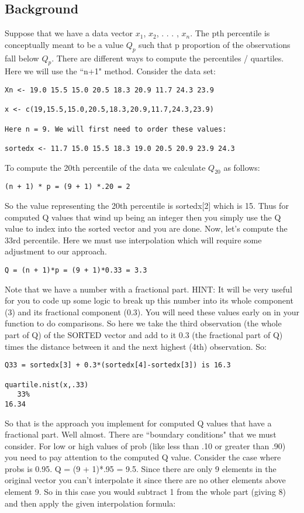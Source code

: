 \documentclass{article}
\begin{document}
\subsection{Background}
Suppose that we have a data vector $x_1$, $x_2$, . . . , $x_n$. The pth percentile is conceptually meant to be a value $Q_p$ such that p proportion of the observations fall below $Q_p$. There are different ways to compute the percentiles / quartiles. Here we will use the ``n+1" method. Consider the data set:
\begin{verbatim}
Xn <- 19.0 15.5 15.0 20.5 18.3 20.9 11.7 24.3 23.9  

x <- c(19,15.5,15.0,20.5,18.3,20.9,11.7,24.3,23.9)

Here n = 9. We will first need to order these values:

sortedx <- 11.7 15.0 15.5 18.3 19.0 20.5 20.9 23.9 24.3

\end{verbatim}
\noindent
To compute the 20th  percentile of the data we calculate $Q_{20}$ as follows:
\begin{verbatim}
(n + 1) * p = (9 + 1) *.20 = 2
\end{verbatim}
\noindent
So the value representing the 20th percentile is sortedx[2] which is 15.
Thus for computed Q values that wind up being an integer then you simply use the Q value to index into the sorted vector and you are done. Now, let's compute the 33rd percentile. Here we must use interpolation which will require some adjustment to our approach.
\begin{verbatim}
Q = (n + 1)*p = (9 + 1)*0.33 = 3.3 
\end{verbatim}
\noindent
Note that we have a number with a fractional part. HINT: It will be very useful for you to code up some logic to break up this number into its whole component (3) and its fractional component (0.3). You will need these values early on in your function to do comparisons. So here we take the third observation (the whole part of Q) of the SORTED vector and add to it 0.3 (the fractional part of Q) times the distance between it and the next highest (4th) observation. So:
\begin{verbatim}
Q33 = sortedx[3] + 0.3*(sortedx[4]-sortedx[3]) is 16.3

quartile.nist(x,.33)
   33% 
16.34 
\end{verbatim}
\noindent
So that is the approach you implement for computed Q values that have a fractional part. Well almost. There are ``boundary conditions" that we must consider. For low or high values of prob (like less than .10 or greater than .90) you need to pay attention to the computed Q value. Consider the case where probs is 0.95. Q = (9 + 1)*.95 = 9.5. Since there are only 9 elements in the original vector you can't interpolate it since there are no other elements above element 9. So in this case you would subtract 1 from the whole part (giving 8) and then apply the given interpolation formula:
\end{document}
